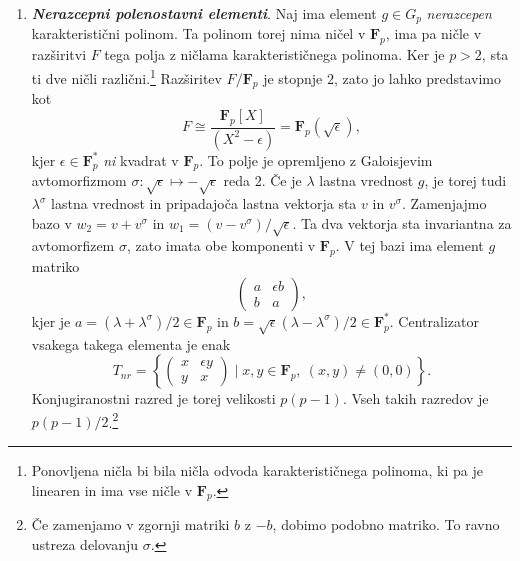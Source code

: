 \documentclass[11pt]{book}
\def\FF{\mathbf{F}}
\def\definicija{\color{rdeca}\bf\em}
\theoremstyle{definition}
\theoremstyle{zgled}
\theoremstyle{odprtproblem}
\theoremstyle{domacanaloga}
\theoremstyle{izrek}
\begin{document}
\begin{enumerate}
    \item {\definicija Nerazcepni polenostavni elementi}. Naj ima element $g \in G_p$ \emph{nerazcepen} karakteristični polinom. Ta polinom torej nima ničel v $\FF_p$, ima pa ničle v razširitvi $F$ tega polja z ničlama karakterističnega polinoma. Ker je $p > 2$, sta ti dve ničli različni.\footnote{Ponovljena ničla bi bila ničla odvoda karakterističnega polinoma, ki pa je linearen in ima vse ničle v $\FF_p$.} Razširitev $F/\FF_p$ je stopnje $2$, zato jo lahko predstavimo kot
    \[
        F \cong \frac{\FF_p[X]}{(X^2 - \epsilon)} = \FF_p(\sqrt{\epsilon}),
    \]
    kjer $\epsilon \in \FF_p^*$ \emph{ni} kvadrat v $\FF_p$. To polje je opremljeno z Galoisjevim avtomorfizmom $\sigma \colon \sqrt{\epsilon} \mapsto - \sqrt{\epsilon}$ reda $2$. Če je $\lambda$ lastna vrednost $g$, je torej tudi $\lambda^{\sigma}$ lastna vrednost in pripadajoča lastna vektorja sta $v$ in $v^{\sigma}$. Zamenjajmo bazo v $w_2 = v + v^{\sigma}$ in $w_1 = (v - v^{\sigma})/\sqrt{\epsilon}$. Ta dva vektorja sta invariantna za avtomorfizem $\sigma$, zato imata obe komponenti v $\FF_p$. V tej bazi ima element $g$ matriko
    \[
        \begin{pmatrix}
            a & \epsilon b \\ b & a
        \end{pmatrix},
    \]
    kjer je $a = (\lambda + \lambda^{\sigma})/2 \in \FF_p$ in $b = \sqrt{\epsilon} (\lambda - \lambda^{\sigma})/2 \in \FF_p^*$. Centralizator vsakega takega elementa je enak
    \[
        T_{nr} = \left\{ \begin{pmatrix}
            x & \epsilon y \\ y & x
        \end{pmatrix} \mid x, y \in \FF_p, \ (x,y) \neq (0,0) \right\}.
    \]
    Konjugiranostni razred je torej velikosti $p(p-1)$. Vseh takih razredov je $p (p-1)/2$.\footnote{Če zamenjamo v zgornji matriki $b$ z $-b$, dobimo podobno matriko. To ravno ustreza delovanju $\sigma$.}
\end{enumerate}
\end{document}
